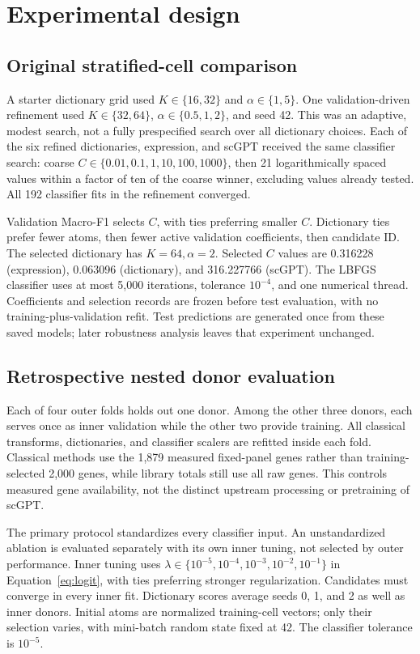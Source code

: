\section{Experimental design}
\subsection{Original stratified-cell comparison}
A starter dictionary grid used $K\in\{16,32\}$ and $\alpha\in\{1,5\}$.
One validation-driven refinement used $K\in\{32,64\}$,
$\alpha\in\{0.5,1,2\}$, and seed 42. This was an adaptive, modest search,
not a fully prespecified search over all dictionary choices. Each of the six
refined dictionaries, expression, and scGPT received the same classifier
search: coarse $C\in\{0.01,0.1,1,10,100,1000\}$, then 21 logarithmically
spaced values within a factor of ten of the coarse winner, excluding values
already tested. All 192 classifier fits in the refinement converged.

Validation Macro-F1 selects $C$, with ties preferring smaller $C$.
Dictionary ties prefer fewer atoms, then fewer active validation coefficients,
then candidate ID. The selected dictionary has $K=64,\alpha=2$.
Selected $C$ values are 0.316228 (expression), 0.063096 (dictionary), and
316.227766 (scGPT). The LBFGS classifier uses at most 5,000 iterations,
tolerance $10^{-4}$, and one numerical thread. Coefficients and selection
records are frozen before test evaluation, with no training-plus-validation
refit. Test predictions are generated once from these saved models; later
robustness analysis leaves that experiment unchanged.

\subsection{Retrospective nested donor evaluation}
Each of four outer folds holds out one donor. Among the other three donors,
each serves once as inner validation while the other two provide training.
All classical transforms, dictionaries, and classifier scalers are refitted
inside each fold. Classical methods use the 1,879 measured fixed-panel genes
rather than training-selected 2,000 genes, while library totals still use all
raw genes. This controls measured gene availability, not the distinct
upstream processing or pretraining of scGPT.

The primary protocol standardizes every classifier input. An unstandardized
ablation is evaluated separately with its own inner tuning, not selected by
outer performance. Inner tuning uses
$\lambda\in\{10^{-5},10^{-4},10^{-3},10^{-2},10^{-1}\}$ in
Equation~\eqref{eq:logit}, with ties preferring stronger regularization.
Candidates must converge in every inner fit. Dictionary scores average
seeds 0, 1, and 2 as well as inner donors. Initial atoms are normalized
training-cell vectors; only their selection varies, with mini-batch random
state fixed at 42. The classifier tolerance is $10^{-5}$.

